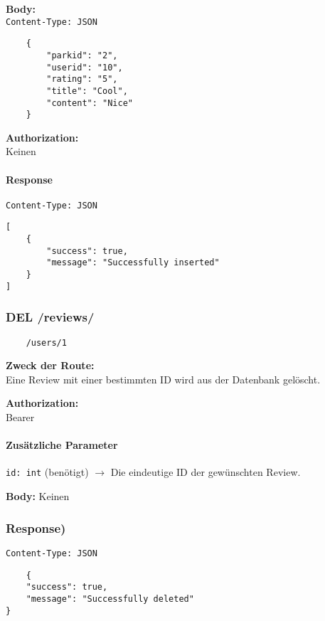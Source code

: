 \textbf{Body:} \\
\lstinline{Content-Type: JSON}
\begin{lstlisting}
    {
        "parkid": "2",
        "userid": "10",
        "rating": "5",
        "title": "Cool",
        "content": "Nice"
    }
\end{lstlisting}

\textbf{Authorization:} \\
Keinen

\paragraph{Response }

\lstinline{Content-Type: JSON}
\begin{lstlisting}
[
    {
        "success": true,
        "message": "Successfully inserted"
    }
]
\end{lstlisting}

\pagebreak


\subsubsection{DEL /reviews/}

\begin{lstlisting}
    /users/1
\end{lstlisting}

\textbf{Zweck der Route:} \\
Eine Review mit einer bestimmten ID wird aus der Datenbank gelöscht.

\textbf{Authorization:} \\
Bearer

\paragraph{Zusätzliche Parameter}
\lstinline{id: int} (benötigt)
$\rightarrow$ Die eindeutige ID der gewünschten Review.

\textbf{Body:}
Keinen


\subsubsection{Response)}

\lstinline{Content-Type: JSON}
\begin{lstlisting}
    {
    "success": true,
    "message": "Successfully deleted"
}
\end{lstlisting}

